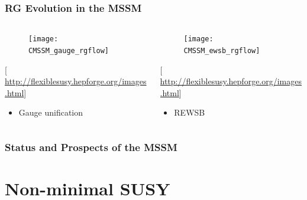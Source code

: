 \documentclass[10pt,aspectratio=169]{beamer}
\begin{document}
\begin{frame}
  \frametitle{RG Evolution in the MSSM}
  \begin{columns}[t]
    \begin{column}{0.5\textwidth}
      \begin{figure}
        \centering
        \texttt{[image: CMSSM\_gauge\_rgflow]}
      \end{figure}
      \vspace{-25pt}
      \begin{center}
        {\tiny [\href{http://flexiblesusy.hepforge.org/images.html}{%
              http://flexiblesusy.hepforge.org/images.html}]}
      \end{center}
      \begin{itemize}\itemsep1em
      \item Gauge unification
      \end{itemize}
    \end{column}
    \begin{column}{0.5\textwidth}
      \begin{figure}
        \centering
        \texttt{[image: CMSSM\_ewsb\_rgflow]}
      \end{figure}
      \vspace{-25pt}
      \begin{center}
        {\tiny [\href{http://flexiblesusy.hepforge.org/images.html}{%
              http://flexiblesusy.hepforge.org/images.html}]}
      \end{center}
      \begin{itemize}\itemsep1em
        \item REWSB
      \end{itemize}
    \end{column}
  \end{columns}
\end{frame}

\begin{frame}
  \frametitle{Status and Prospects of the MSSM}
\end{frame}

\section{Non-minimal SUSY}
\end{document}
